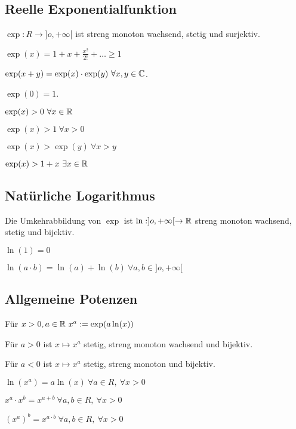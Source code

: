 \subsection{Reelle Exponentialfunktion}
$\exp: R \to ]o, +\infty[$ ist streng monoton wachsend, stetig und surjektiv.
\begin{compactitem}
    \item $\exp(x) = 1 + x + \frac{x^2}{2!} + \dots \ge 1$
    \item $\exp(x + y ) = \exp(x) \cdot \exp(y) \ \forall x,y \in \C$.
    \item $\exp(0) = 1$.
    \item $\exp(x) > 0 \ \forall x \in \mathbb{R}$
    \item $\exp(x) > 1 \ \forall x > 0$
    \item $\exp(x) > \exp(y) \ \forall x > y$
    \item $\exp(x) > 1 + x \ \exists x \in \mathbb{R}$
\end{compactitem}

\subsection{Natürliche Logarithmus}
Die Umkehrabbildung von $\exp$ ist $\ln: ]o, +\infty[ \to \mathbb{R}$ streng monoton wachsend, stetig und bijektiv.
\begin{compactitem}
    \item $\ln(1) = 0$
    \item $\ln(a \cdot b) = \ln(a) + \ln(b) \ \forall a,b \in ]o, +\infty[$
\end{compactitem}

\subsection{Allgemeine Potenzen}
Für $x > 0, a \in \mathbb{R} \ x^a := \exp(a \ln(x))$
\begin{compactitem}
    \item Für $a > 0$ ist $x \mapsto x^a$ stetig, streng monoton wachsend und bijektiv.
    \item Für $a < 0$ ist $x \mapsto x^a$ stetig, streng monoton und bijektiv.
    \item $\ln(x^a) = a \ln(x) \ \forall a \in R, \ \forall x > 0$
    \item $x^a \cdot x ^b = x^{a + b} \ \forall a,b \in R, \ \forall x > 0$
    \item $(x^a)^b = x^{a \cdot b} \ \forall a,b \in R, \ \forall x > 0$
\end{compactitem}
